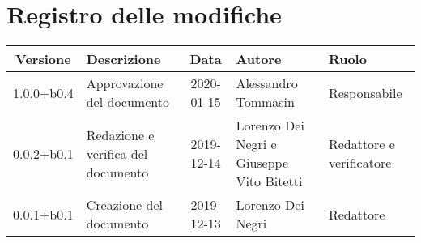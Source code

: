 \section*{Registro delle modifiche}

\begin{center}
	\begin{longtable}{|c|p{3.5cm}|c|p{3cm}|p{3cm}|}
		\hline
		\rowcolor{lighter-grayer}
		\textbf{Versione} & \textbf{Descrizione} & \textbf{Data} & \textbf{Autore} & \textbf{Ruolo} \\
		\hline
		\endfirsthead


	1.0.0+b0.4 & Approvazione del documento & 2020-01-15 & Alessandro Tommasin & Responsabile \\
	\hline
	0.0.2+b0.1 & Redazione e verifica del documento & 2019-12-14 & Lorenzo Dei Negri e Giuseppe Vito Bitetti & Redattore e verificatore \\
	\hline
	0.0.1+b0.1 & Creazione del documento & 2019-12-13 & Lorenzo Dei Negri & Redattore \\
	\hline

	\end{longtable}
\end{center}
